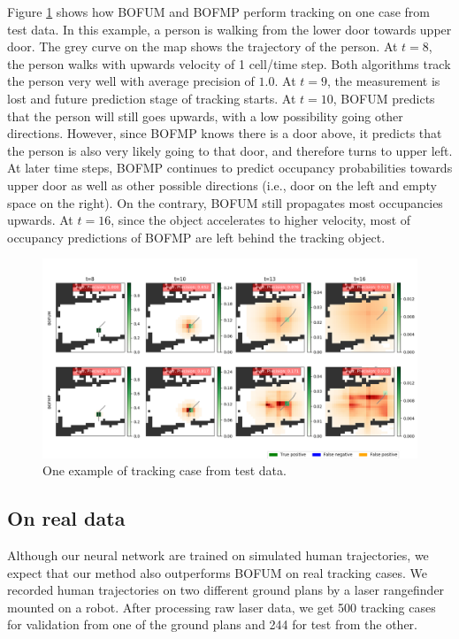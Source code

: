 Figure \ref{fig:tracking_simulated_data} shows how BOFUM and BOFMP perform tracking on one case from test data. In this example, a person is walking from the lower door towards upper door. The grey curve on the map shows the trajectory of the person. At $t=8$, the person walks with upwards velocity of 1 cell/time step. Both algorithms track the person very well with average precision of $1.0$. At $t=9$, the measurement is lost and future prediction stage of tracking starts. At $t=10$, BOFUM predicts that the person will still goes upwards, with a low possibility going other directions. However, since BOFMP knows there is a door above, it predicts that the person is also very likely going to that door, and therefore turns to upper left. At later time steps, BOFMP continues to predict occupancy probabilities towards upper door as well as other possible directions (i.e., door on the left and empty space on the right). On the contrary, BOFUM still propagates most occupancies upwards. At $t=16$, since the object accelerates to higher velocity, most of occupancy predictions of BOFMP are left behind the tracking object.
\begin{figure}[ht]
  \centering
    \includegraphics[width=\textwidth]{figures/tracking_sample_for_simulated_data.png}
    \caption{One example of tracking case from test data.}
    \label{fig:tracking_simulated_data}
\end{figure}

\subsection{On real data}

Although our neural network are trained on simulated human trajectories, we expect that our method also outperforms BOFUM on real tracking cases. We recorded human trajectories on two different ground plans by a laser rangefinder mounted on a robot. After processing raw laser data, we get 500 tracking cases for validation from one of the ground plans and 244 for test from the other. 



